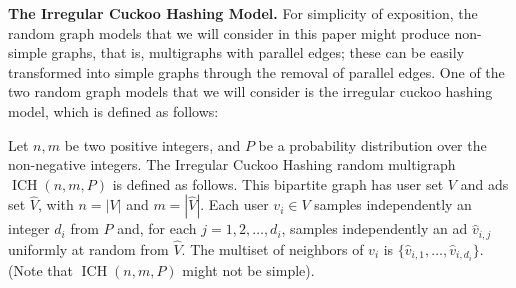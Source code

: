 \documentclass[11pt]{article}
\DeclareMathOperator*{\irregularcuckoohashing}{ICH}
\begin{document}
{\bf The Irregular Cuckoo Hashing Model.} For simplicity of exposition, the random graph models that we will consider in this paper might produce non-simple graphs, that is, multigraphs with parallel edges; these can be easily  transformed into simple graphs through the removal of parallel edges. One of the two  random graph models that we will consider  is the irregular cuckoo hashing model, which is defined as follows:
\begin{definition}
Let $n, m$ be two positive integers, and $P$ be a probability distribution over the non-negative integers. The Irregular Cuckoo Hashing random multigraph $\irregularcuckoohashing(n,m,P)$ is defined as follows. 
This bipartite graph has user set $V$ and ads set $\hat{V}$, with $n = |V|$ and $m = |\hat{V}|$. Each user $v_i \in V$ samples independently an integer $d_i$ from $P$ and, for each $j = 1,2,\ldots,d_i$, samples independently an ad $\hat{v}_{i,j}$ uniformly at random from $\hat{V}$. The multiset of neighbors of $v_i$ is  $\{\hat{v}_{i,1},\ldots,\hat{v}_{i,d_i}\}$. (Note that $\irregularcuckoohashing(n,m,P)$ might not be simple).
\end{definition}
\smallskip
\end{document}

